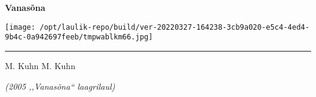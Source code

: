 \documentclass[10pt]{book}
\begin{document}
{
  \samepage
  \raggedbottom
  \raggedright
  \sloppy


  \vspace{0.2in}
    \noindent\begin{minipage}{.1\textwidth}
      \hfill\vspace{0.1in}
    \end{minipage}%
    \noindent\begin{minipage}{.8\textwidth}
      \centering
      \bfseries
      \large Vanasõna
    \end{minipage}%
    \noindent\begin{minipage}{.1\textwidth}
      \texttt{[image: /opt/laulik-repo/build/ver-20220327-164238-3cb9a020-e5c4-4ed4-9b4c-0a942697feeb/tmpwablkm66.jpg]}
    \end{minipage}
  \nopagebreak[4]
  \vspace{0.1in}
  \nopagebreak[4]
  \hrule height 0.05ex
  \nopagebreak[4]
  \vspace{-0.05in}

  {\footnotesize M. Kuhn \hfill M. Kuhn }\\
  \vspace{0.01in}

  {\em {\footnotesize (2005 ,,Vanas\~ona{``} laagrilaul) } }
  \vspace{0.01in}

    \vspace{-0.05in}
  \nopagebreak[4]
  {%
\parindent 0pt
\noindent
\ifx\preLilyPondExample \undefined
\else
  \expandafter\preLilyPondExample
\fi
\def\lilypondbook{}%

\ifx\postLilyPondExample \undefined
\else
  \expandafter\postLilyPondExample
\fi
}
  \vspace{-0.1in}

}
\end{document}
